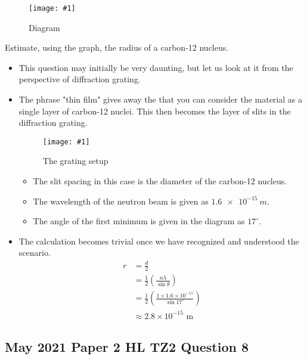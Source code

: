 \documentclass[a4paper,12pt]{article}
\newcommand{\degsym}{^{\circ}}
\newcommand{\img}[4]{\begin{center}
  \begin{figure}[H]
    \centering
    \texttt{[image: \#1]}
    \caption{#3}
    \label{fig:#4}
  \end{figure}
\end{center}}
\newcommand{\paren}[1]{\left(#1\right)}
\begin{document}
\img{ex/5.png}{0.5}{Diagram}{ex5}

Estimate, using the graph, the radius of a carbon-12 nucleus.
\begin{itemize}
  \item This question may initially be very daunting, but let us look at it from the perspective of diffraction grating.
  \item The phrase "thin film" gives away the that you can consider the material as a single layer of carbon-12 nuclei. This then becomes the layer of slits in the diffraction grating.
        \img{ex/6.png}{0.99}{The grating setup}{ex6}
        \begin{itemize}
          \item The slit spacing in this case is the diameter of the carbon-12 nucleus.
          \item The wavelength of the neutron beam is given as $\SI{1.6e-15}{m}$.
          \item The angle of the first minimum is given in the diagram as $17\degsym$.
        \end{itemize}
  \item The calculation becomes trivial once we have recognized and understood the scenario.
        \begin{align*}
          r & = \frac{d}{2}                                                           \\
            & = \frac{1}{2}\paren{\frac{n\lambda}{\sin\theta}}                        \\
            & = \frac{1}{2}\paren{\frac{1\times 1.6 \times 10^{-15}}{\sin 17\degsym}} \\
            & \approx 2.8 \times 10^{-15} \text{ m}
        \end{align*}
\end{itemize}

\pagebreak

\subsection{May 2021 Paper 2 HL TZ2 Question 8}
\end{document}

